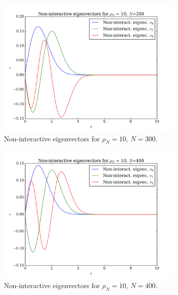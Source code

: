 \documentclass[11pt,a4paper,notitlepage]{article}
\begin{document}
\begin{figure}[H]
\begin{subfigure}[b]{0.45\textwidth}
 		\includegraphics[scale=0.40]{../non_interacting_eigvec_plot_rhoN=10_N=300.png}
 		\caption{Non-interactive eigenvectors for $\rho_N = 10$, $N = 300$.}\label{fig:eigvecs-non-interact-10-300}
 	\end{subfigure}
 	\hfill
 	\begin{subfigure}[b]{0.45\textwidth}
 		\includegraphics[scale=0.40]{../non_interacting_eigvec_plot_rhoN=10_N=400.png}
 		\caption{Non-interactive eigenvectors for $\rho_N = 10$, $N = 400$.}\label{fig:eigvecs-non-interact-10-400}
 	\end{subfigure}
 \begin{subfigure}[t]{0.45\textwidth}

\end{subfigure}
\end{figure}
\end{document}
